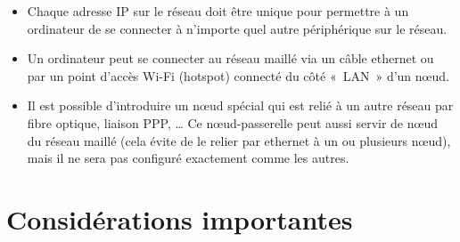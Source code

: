 \documentclass[a4paper,french,11pt,twoside]{article}
\begin{document}
\begin{itemize}
     \item{Chaque adresse IP sur le réseau doit être unique pour permettre à un ordinateur de se connecter à n'importe quel autre périphérique sur le réseau.}
     \item{Un ordinateur peut se connecter au réseau maillé via un câble ethernet ou par un point d'accès Wi-Fi (hotspot) connecté du côté «~LAN~» d'un nœud.}
     \item{Il est possible d'introduire un nœud spécial qui est relié à un autre réseau par fibre optique, liaison PPP, … Ce nœud-passerelle peut aussi servir de nœud du réseau maillé (cela évite de le relier par ethernet à un ou plusieurs nœud), mais il ne sera pas configuré exactement comme les autres.}
\end{itemize}

\section{Considérations importantes}
\end{document}
